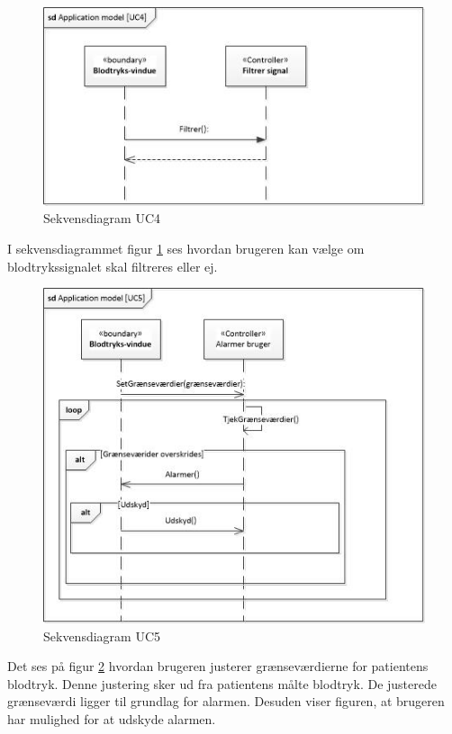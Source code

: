 \begin{figure}[H]
	\includegraphics[width=1\textwidth]{Figurer/ISE/sdAppModelUC4}
	\caption{Sekvensdiagram UC4}
	\label{sd UC4}
\end{figure}

I sekvensdiagrammet figur \ref{sd UC4} ses hvordan brugeren kan vælge om blodtrykssignalet skal filtreres eller ej.

\begin{figure}[H]
	\includegraphics[width=1\textwidth]{Figurer/ISE/sdAppModelUC5}
	\caption{Sekvensdiagram UC5}
	\label{sd UC5}
\end{figure}

Det ses på figur \ref{sd UC5} hvordan brugeren justerer grænseværdierne for patientens blodtryk. Denne justering sker ud fra patientens målte blodtryk. De justerede grænseværdi ligger til grundlag for alarmen. Desuden viser figuren, at brugeren har mulighed for at udskyde alarmen.

